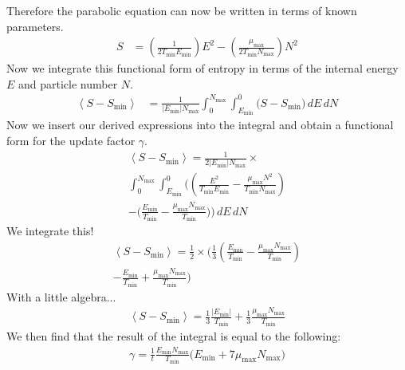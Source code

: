 \documentclass[letterpaper,twocolumn,amsmath,amssymb,pre,aps,10pt]{revtex4-1}
\newcommand{\Int}{\int}
\newcommand\Emin{E_{\min}}
\newcommand\Nmax{N_{\max}}
\newcommand\Tmin{T_{\min}}
\newcommand\mumax{\mu_{\max}}
\begin{document}
Therefore the parabolic equation can now be written in terms of known parameters.
\begin{align}
S &= \left( \frac{1}{2 \Tmin \Emin}\right) E^2
    - \left( \frac{\mumax}{2 \Tmin \Nmax}\right) N^2
\end{align}
Now we integrate this functional form of entropy in terms of the internal energy $E$ and particle number $N$.
\begin{align}
\left<S-S_{\min}\right>
  &=\frac{1}{|\Emin|\Nmax}\Int_{0}^{\Nmax} \Int_{\Emin}^{0} \bigg( S - S_{\min}\bigg) \,dE\,dN
\end{align}
Now we insert our derived expressions into the integral and obtain a functional form for the update factor $\gamma$.
\begin{multline}
\left<S-S_{\min}\right>
  = \frac1{2|\Emin|\Nmax}\times\\
  \Int_{0}^{\Nmax} \!\!\!\!\!\int_{\Emin}^{0}\!\!
   \Bigg(\left( \frac{E^2}{\Tmin\Emin}
         - \frac{\mumax N^2}{\Tmin\Nmax}\right)
    \\
    - \bigg( \frac{\Emin}{\Tmin}  - \frac{\mumax\Nmax}{\Tmin} \bigg)\Bigg) \,dE\,dN
\end{multline}
We integrate this!
\begin{multline}
\left<S-S_{\min}\right>
  =
   \frac1{2}\times\Bigg(\frac13\left(\frac{\Emin}{\Tmin}
    -\frac{\mumax \Nmax}{\Tmin}
  \right)
    \\
    - \frac{\Emin}{\Tmin}  + \frac{\mumax\Nmax}{\Tmin} \Bigg)
\end{multline}
With a little algebra...
\begin{align}
\left<S-S_{\min}\right>
  = \frac13\frac{|\Emin|}{\Tmin}  + \frac13\frac{\mumax\Nmax}{\Tmin}
\end{align}
We then find that the result of the integral is equal to the following:
\begin{align}
\gamma =\frac{1}{t} \frac{\Emin\Nmax}{\Tmin}\bigg(\Emin + 7 \mumax\Nmax \bigg)
\end{align}

\end{document}
